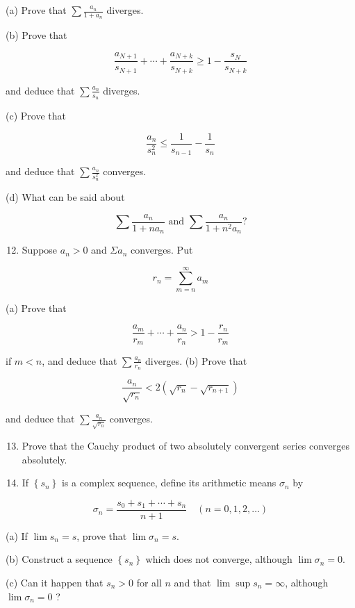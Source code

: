 \documentclass[10pt]{article}
\begin{document}
(a) Prove that $\sum \frac{a_{n}}{1+a_{n}}$ diverges.

(b) Prove that

$$
\frac{a_{N+1}}{s_{N+1}}+\cdots+\frac{a_{N+k}}{s_{N+k}} \geq 1-\frac{s_{N}}{s_{N+k}}
$$

and deduce that $\sum \frac{a_{n}}{s_{n}}$ diverges.

(c) Prove that

$$
\frac{a_{n}}{s_{n}^{2}} \leq \frac{1}{s_{n-1}}-\frac{1}{s_{n}}
$$

and deduce that $\sum \frac{a_{n}}{s_{n}^{2}}$ converges.

(d) What can be said about

$$
\sum \frac{a_{n}}{1+n a_{n}} \text { and } \sum \frac{a_{n}}{1+n^{2} a_{n}} ?
$$

\begin{enumerate}
  \setcounter{enumi}{11}
  \item Suppose $a_{n}>0$ and $\Sigma a_{n}$ converges. Put
\end{enumerate}

$$
r_{n}=\sum_{m=n}^{\infty} a_{m}
$$

(a) Prove that

$$
\frac{a_{m}}{r_{m}}+\cdots+\frac{a_{n}}{r_{n}}>1-\frac{r_{n}}{r_{m}}
$$

if $m<n$, and deduce that $\sum \frac{a_{n}}{r_{n}}$ diverges.
(b) Prove that

$$
\frac{a_{n}}{\sqrt{r_{n}}}<2\left(\sqrt{r_{n}}-\sqrt{r_{n+1}}\right)
$$

and deduce that $\sum \frac{a_{n}}{\sqrt{r_{n}}}$ converges.

\begin{enumerate}
  \setcounter{enumi}{12}
  \item Prove that the Cauchy product of two absolutely convergent series converges absolutely.

  \item If $\left\{s_{n}\right\}$ is a complex sequence, define its arithmetic means $\sigma_{n}$ by

\end{enumerate}

$$
\sigma_{n}=\frac{s_{0}+s_{1}+\cdots+s_{n}}{n+1} \quad(n=0,1,2, \ldots)
$$

(a) If $\lim s_{n}=s$, prove that $\lim \sigma_{n}=s$.

(b) Construct a sequence $\left\{s_{n}\right\}$ which does not converge, although $\lim \sigma_{n}=0$.

(c) Can it happen that $s_{n}>0$ for all $n$ and that $\lim \sup s_{n}=\infty$, although $\lim \sigma_{n}=0$ ?
\end{document}
